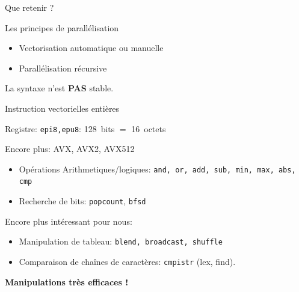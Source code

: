 \documentclass{beamer}
\begin{document}
\begin{frame}{Que retenir ?}

  \begin{NOTE}
    Les principes de parallélisation
    \begin{itemize}
    \item Vectorisation automatique ou manuelle
      \bigskip

    \item Parallélisation récursive
    \end{itemize}
  \end{NOTE}
  \bigskip\bigskip

  La syntaxe n'est \textbf{PAS} stable.
\end{frame}

\begin{frame}{Instruction vectorielles entières}

  Registre: \texttt{epi8,epu8}: 128~bits $=$ 16~octets
  \bigskip

  Encore plus: AVX, AVX2, AVX512
  \medskip

  \begin{itemize}
  \item Opérations Arithmetiques/logiques: \texttt{and, or, add, sub, min, max, abs, cmp}
  \item Recherche de bits: \texttt{popcount}, \texttt{bfsd}
  \end{itemize}
  \pause
  Encore plus intéressant pour nous:
  \begin{itemize}
  \item Manipulation de tableau: \texttt{blend, broadcast, shuffle}
  \item Comparaison de chaînes de caractères: \texttt{cmpistr} (lex, find).
  \end{itemize}
  \begin{tcolorbox}
    \centering
    \textbf{\large Manipulations très efficaces !}
  \end{tcolorbox}
\end{frame}
\end{document}
